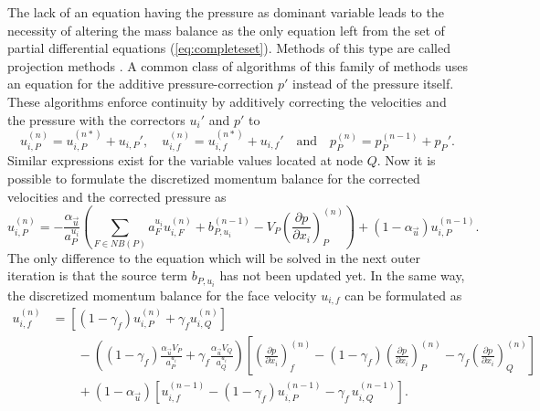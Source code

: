 The lack of an equation having the pressure as dominant variable leads to the necessity of altering the mass balance as the only equation left from the set of partial differential equations (\ref{eq:completeset}). Methods of this type are called projection methods \cite{ferziger02}. A common class of algorithms of this family of methods uses an equation for the additive pressure-correction \(p'\) instead of the pressure itself. These algorithms enforce continuity by additively correcting the velocities and the pressure with the correctors \(u_i'\) and \(p'\) to
\begin{displaymath}
  u_{i,P}^{(n)} =  u_{i,P}^{(n*)}  + u_{i,P}',\quad u_{i,f}^{(n)} =  u_{i,f}^{(n*)}  + u_{i,f}' \quad \text{and} \quad   p_P^{(n)} =  p_P^{(n-1)}  + p_P'.
\end{displaymath}
Similar expressions exist for the variable values located at node \(Q\). Now it is possible to formulate the discretized momentum balance for the corrected velocities and the corrected pressure as
\begin{equation}
  \label{eq:nodecorr}
  u_{i,P}^{(n)} 
  = 
  - \frac{\alpha_{\vec{u}}}{a_P^{u_i}} \left(\sum_{F \in NB(P)} a_F^{u_i} u_{i,F}^{(n)}
  +                                     b_{P,u_i}^{(n-1)} 
  -                                     V_P\left(\frac{\partial p}{\partial x_i}\right)_P^{(n)} \right)
  + \left(1 - \alpha_{\vec{u}}\right) u_{i,P}^{(n-1)}.
\end{equation}
The only difference to the equation which will be solved in the next outer iteration is that the source term \(b_{P,u_i}\) has not been updated yet. In the same way, the discretized momentum balance for the face velocity \(u_{i,f}\) can be formulated as
\begin{align}
  \label{eq:facecorr}
  u_{i,f}^{(n)} 
  &=
  \left[\left(1 - \gamma_f\right) u_{i,P}^{(n)} + \gamma_f u_{i,Q}^{(n)} \right] \nonumber\\[1em]
  &\quad\quad - 
  \left(\left(1 - \gamma_f\right) \frac{\alpha_\vec{u} V_P}{a_P^{u_i}} + \gamma_f \frac{\alpha_\vec{u} V_Q}{a_Q^{u_i}}\right)
  \left[ 
  \left(\frac{\partial p}{\partial x_i}\right)_f^{(n)} 
  -  \left(1 - \gamma_f\right) \left( \frac{\partial p}{\partial x_i} \right)_P^{(n)} 
  - \gamma_f \left(\frac{\partial p}{\partial x_i}\right)_Q^{(n)} 
  \right] \nonumber \\[1em]
  &\quad\quad + \left(1 - \alpha_\vec{u}\right) \left[ u_{i,f}^{(n-1)} - \left(1 - \gamma_f\right) u_{i,P}^{(n-1)} - \gamma_f \, u_{i,Q}^{(n-1)} \right].
\end{align}
